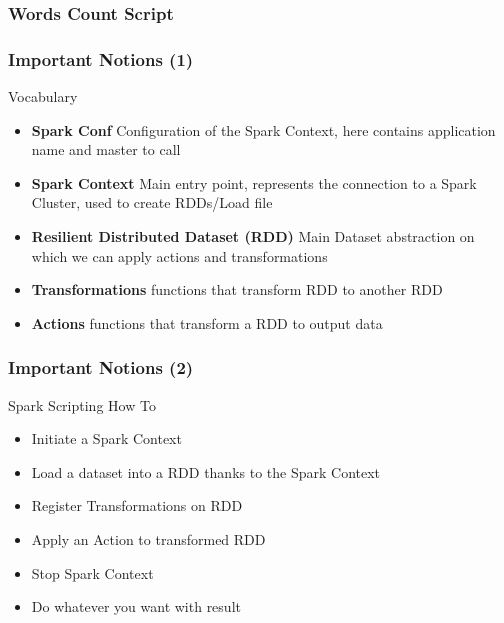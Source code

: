 \documentclass[slidetop,9pt,utf8]{beamer}
\begin{document}
\begin{frame}[fragile]
  \frametitle{Words Count Script}

  

\end{frame}

\begin{frame}
  \frametitle{Important Notions (1)}

  \begin{block}{Vocabulary}
    \begin{itemize}
      \item \textbf{Spark Conf} Configuration of the Spark Context, here contains application name and master to call
      \item \textbf{Spark Context} Main entry point, represents the connection to a Spark Cluster, used to create RDDs/Load file
      \item \textbf{Resilient Distributed Dataset (RDD)} Main Dataset abstraction on which we can apply actions and transformations
      \item \textbf{Transformations} functions that transform RDD to another RDD
      \item \textbf{Actions} functions that transform a RDD to output data
    \end{itemize}
  \end{block}

\end{frame}

\begin{frame}
  \frametitle{Important Notions (2)}

  \begin{block}{Spark Scripting How To}
    \begin{itemize}
      \item Initiate a Spark Context
      \item Load a dataset into a RDD thanks to the Spark Context
      \item Register Transformations on RDD
      \item Apply an Action to transformed RDD
      \item Stop Spark Context
      \item Do whatever you want with result
    \end{itemize}
  \end{block}

\end{frame}
\end{document}

